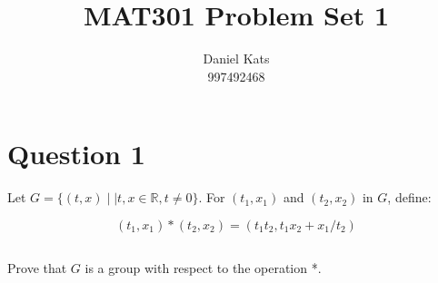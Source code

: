 \documentclass[a4paper,12pt]{article}
\begin{document}
\begin{titlepage}
\title{MAT301 Problem Set 1}
\author{Daniel Kats \\ 997492468}
\clearpage
\maketitle
\thispagestyle{empty}
\end{titlepage}

\section{Question 1}
Let $G = \{ ( t, x ) \mid| t, x \in \mathbb{R}, t \neq 0 \}$. For $( t_1 , x_1 )$ and $( t_2 , x_2 )$ in $G$, define:

\begin{equation*}
( t_1 , x_1 ) \ast ( t_2 , x_2 ) = ( t_1 t_2 , t_1 x_2 + x_1 / t_2 )
\end{equation*}

\subsection{}

Prove that $G$ is a group with respect to the operation *.
\end{document}
